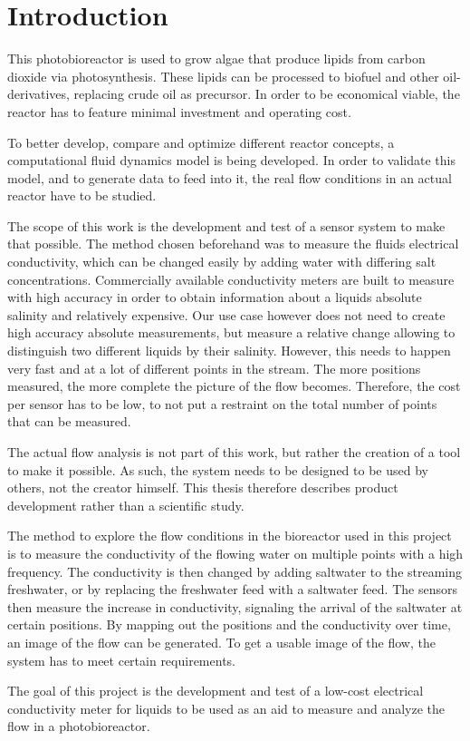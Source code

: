 \chapter{Introduction}

This photobioreactor is used to grow algae that produce lipids from carbon dioxide via photosynthesis. These lipids can be processed to biofuel and other oil-derivatives, replacing crude oil as precursor. In order to be economical viable, the reactor has to feature minimal investment and operating cost.

To better develop, compare and optimize different reactor concepts, a computational fluid dynamics model is being developed. In order to validate this model, and to generate data to feed into it, the real flow conditions in an actual reactor have to be studied.

The scope of this work is the development and test of a sensor system to make that possible. The method chosen beforehand was to measure the fluids electrical conductivity, which can be changed easily by adding water with differing salt concentrations. Commercially available conductivity meters are built to measure with high accuracy in order to obtain information about a liquids absolute salinity and relatively expensive. Our use case however does not need to create high accuracy absolute measurements, but measure a relative change allowing to distinguish two different liquids by their salinity. However, this needs to happen very fast and at a lot of different points in the stream. The more positions measured, the more complete the picture of the flow becomes. Therefore, the cost per sensor has to be low, to not put a restraint on the total number of points that can be measured.

The actual flow analysis is not part of this work, but rather the creation of a tool to make it possible. As such, the system needs to be designed to be used by others, not the creator himself. This thesis therefore describes product development rather than a scientific study.

The method to explore the flow conditions in the bioreactor used in this project is to measure the conductivity of the flowing water on multiple points with a high frequency. The conductivity is then changed by adding saltwater to the streaming freshwater, or by replacing the freshwater feed with a saltwater feed. The sensors then measure the increase in conductivity, signaling the arrival of the saltwater at certain positions. By mapping out the positions and the conductivity over time, an image of the flow can be generated. To get a usable image of the flow, the system has to meet certain requirements.

The goal of this project is the development and test of a low-cost electrical conductivity meter for liquids to be used as an aid to measure and analyze the flow in a photobioreactor.